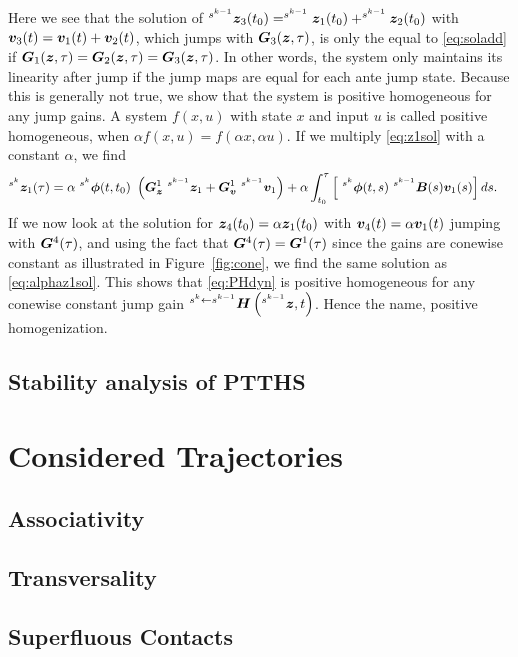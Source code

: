 \documentclass[../DC2017114Bouma.tex]{subfiles}
\begin{document}
Here we see that the solution of $^{s^{k-1}}{\boldsymbol{z}}_3(t_0) = ^{s^{k-1}}{\boldsymbol{z}}_1(t_0) + ^{s^{k-1}}{\boldsymbol{z}}_2(t_0)$ with ${\boldsymbol{v}}_3(t) = {\boldsymbol{v}}_1(t) + {\boldsymbol{v}}_2(t)$, which jumps with ${\boldsymbol{G}}_3({\boldsymbol{z}},\tau)$, is only the equal to \eqref{eq:soladd} if ${\boldsymbol{G}}_1({\boldsymbol{z}},\tau) = {\boldsymbol{G}}_2({\boldsymbol{z}},\tau) = {\boldsymbol{G}}_3({\boldsymbol{z}},\tau)$. In other words, the system only maintains its linearity after jump if the jump maps are equal for each ante jump state. Because this is generally not true, we show that the system is positive homogeneous for any jump gains. A system $f(x,u)$ with state $x$ and input $u$ is called positive homogeneous, when $\alpha f(x,u) = f(\alpha x, \alpha u)$. If we multiply \eqref{eq:z1sol} with a constant $\alpha$, we find
\begin{align}
^{s^{k}}\zb_1(\tau) &= \alpha \ ^{s^{k}}\phib(t,t_0)\ \left(\Gb_\zb^1 \ ^{s^{k-1}}\zb_1 + \Gb_\vb^1\ ^{s^{k-1}}\vb_1\right) + \alpha\int_{t_0}^\tau \left[\ ^{s^{k}}\phib(t,s)\ ^{s^{k-1}}\Bb(s)\vb_1(s)\right]ds.\label{eq:alphaz1sol}
\end{align}
If we now look at the solution for ${\boldsymbol{z}}_4(t_0) = \alpha{\boldsymbol{z}}_1(t_0)$ with ${\boldsymbol{v}}_4(t) = \alpha{\boldsymbol{v}}_1(t)$ jumping with ${\boldsymbol{G}}^4(\tau)$, and using the fact that ${\boldsymbol{G}}^4(\tau) = {\boldsymbol{G}}^1(\tau)$ since the gains are conewise constant as illustrated in Figure~\ref{fig:cone}, we find the same solution as \eqref{eq:alphaz1sol}. This shows that \eqref{eq:PHdyn} is positive homogeneous for any conewise constant jump gain $^{s^{k}\leftarrow s^{k-1}}{\boldsymbol{H}}\left(^{s^{k-1}}{\boldsymbol{z}},t\right)$. Hence the name, positive homogenization. 

\section{Stability analysis of PTTHS}

\pagestyle{fancyreport}
\cleartooddpage
\pagestyle{fancyreport}
\chapter{Considered Trajectories}\label{app:trajectories}
\section{Associativity}
\section{Transversality}
\section{Superfluous Contacts}
\end{document}
